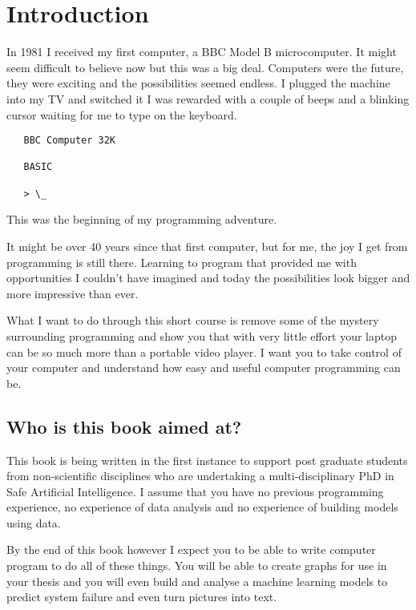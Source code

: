 \section{Introduction} \label{sec:WhyPython}


In 1981 I received my first computer, a BBC Model B microcomputer. It might seem difficult to believe now but this was a big deal. Computers were the future, they were exciting and the possibilities seemed endless. I plugged the machine into my TV and switched it I was rewarded with a couple of beeps and a blinking cursor waiting for me to type on the keyboard. 

\begin{verbatim}
   BBC Computer 32K
   
   BASIC
   
   > \_
\end{verbatim}


This was the beginning of my programming adventure.

It might be over 40 years since that first computer, but for me, the joy I get from programming is still there. Learning to program that provided me with opportunities I couldn't have imagined and today the possibilities look bigger and more impressive than ever.

What I want to do through this short course is remove some of the mystery surrounding  programming and show you that with very little effort your laptop can be so much more than a portable video player. I want you to take control of your computer and understand how easy and useful computer programming can be.


\subsection{Who is this book aimed at?}

This book is being written in the first instance to support post graduate students from non-scientific disciplines who are undertaking a multi-disciplinary PhD in Safe Artificial Intelligence. I assume that you have no previous programming experience, no experience of data analysis and no experience of building models using data.

By the end of this book however I expect you to be able to write computer program to do all of these things. You will be able to create graphs for use in your thesis and you will even build and analyse a machine learning models to predict system failure and even turn pictures into text.


